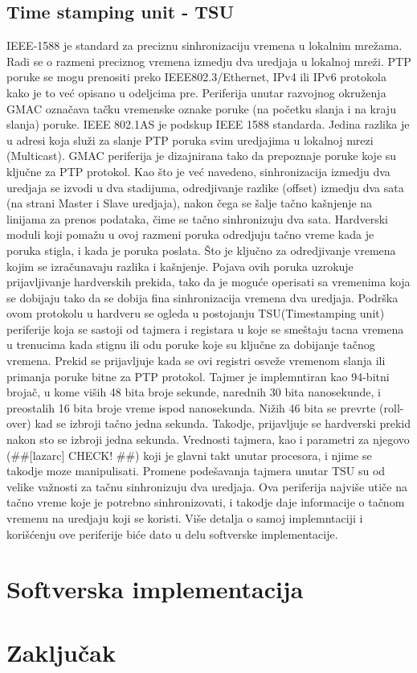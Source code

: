 \documentclass[a4paper,12pt, master]{etf}
\begin{document}
	\section{Time stamping unit - TSU}
	IEEE-1588 je standard za preciznu sinhronizaciju vremena u lokalnim mre\v{z}ama. Radi se o 
	razmeni	preciznog vremena izmedju dva uredjaja u lokalnoj mre\v{z}i. PTP poruke se mogu 
	prenositi preko	IEEE802.3/Ethernet, IPv4 ili IPv6 protokola kako je to ve\'{c} opisano u 
	odeljcima pre. Periferija unutar razvojnog okru\v{z}enja GMAC ozna\v{c}ava ta\v{c}ku 
	vremenske oznake poruke (na po\v{c}etku slanja i na kraju slanja) poruke. IEEE 802.1AS je 
	podskup IEEE 1588 standarda. Jedina razlika je u adresi koja slu\v{z}i za slanje PTP poruka 
	svim uredjajima u lokalnoj mrezi (Multicast). GMAC periferija je dizajnirana tako da 
	prepoznaje poruke koje su klju\v{c}ne za PTP protokol. Kao \v{s}to je ve\'{c} navedeno, 
	sinhronizacija izmedju dva uredjaja se izvodi u dva stadijuma, odredjivanje razlike	(offset) 
	izmedju dva sata (na strani Master i Slave uredjaja), nakon \v{c}ega se \v{s}alje ta\v{c}no	
	ka\v{s}njenje na linijama za prenos podataka, \v{c}ime se ta\v{c}no sinhronizuju dva sata. 
	Hardverski moduli koji poma\v{z}u u ovoj razmeni poruka odredjuju ta\v{c}no vreme kada je 
	poruka stigla, i kada je poruka poslata. \v{S}to je klju\v{c}no za odredjivanje vremena 
	kojim se izra\v{c}unavaju razlika i ka\v{s}njenje. Pojava ovih poruka uzrokuje 
	prijavljivanje hardverskih prekida, tako da je mogu\'{c}e operisati sa vremenima koja se 
	dobijaju tako da se dobija fina sinhronizacija vremena dva uredjaja. Podr\v{s}ka ovom 
	protokolu u hardveru se ogleda u postojanju TSU(Timestamping unit) periferije 
	koja se sastoji od tajmera i registara u koje se sme\v{s}taju tacna vremena u trenucima kada 
	stignu ili odu poruke koje su klju\v{c}ne za dobijanje ta\v{c}nog vremena. Prekid se 
	prijavljuje kada se ovi	registri osve\v{z}e vremenom slanja ili primanja poruke bitne za PTP 
	protokol. Tajmer je implemntiran kao 94-bitni broja\v{c}, u kome vi\v{s}ih 48 bita broje 
	sekunde, narednih 30 bita nanosekunde, i preostalih 16 bita broje vreme ispod nanosekunda. 
	Ni\v{z}ih 46 bita se prevrte (roll-over) kad se izbroji ta\v{c}no jedna sekunda. Takodje, 
	prijavljuje se hardverski prekid nakon sto se izbroji jedna sekunda. Vrednosti tajmera, kao 
	i parametri za njegovo (##[lazarc] CHECK! ##) koji je glavni takt unutar procesora, i njime 
	se takodje moze manipulisati. Promene pode\v{s}avanja tajmera unutar TSU su od velike 
	va\v{z}nosti za ta\v{c}nu sinhronizuju dva uredjaja. Ova periferija najvi\v{s}e uti\v{c}e na 
	ta\v{c}no vreme koje je potrebno sinhronizovati, i takodje daje informacije o ta\v{c}nom 
	vremenu na uredjaju koji se koristi. Vi\v{s}e detalja o samoj implemntaciji i 
	kori\v{s}\'{c}enju ove periferije bi\'{c}e dato u delu softverske implementacije.

	\newpage

	\chapter{Softverska implementacija}

	\newpage

	\chapter{Zaključak}

	\newpage
\end{document}
